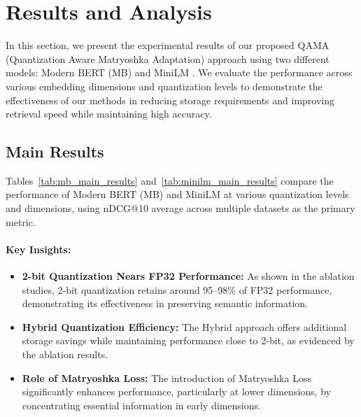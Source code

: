 \section{Results and Analysis}
\label{sec:results}

In this section, we present the experimental results of our proposed QAMA (Quantization Aware Matryoshka Adaptation) approach using two different models: Modern BERT (MB) \cite{modernbert, nussbaum2024nomic} and MiniLM \cite{minilm, reimers-2019-sentence-bert}. 
We evaluate the performance across various embedding dimensions and quantization levels to demonstrate the effectiveness of our methods in reducing storage requirements and improving retrieval speed while maintaining high accuracy.

\subsection{Main Results}
\label{sec:main_results}

Tables~\ref{tab:mb_main_results} and~\ref{tab:minilm_main_results} compare the performance of Modern BERT (MB) and MiniLM at various quantization levels and dimensions, using nDCG@10 average across multiple datasets as the primary metric. 
\paragraph{Key Insights:}
\begin{itemize}
    \item \textbf{2-bit Quantization Nears FP32 Performance:} As shown in the ablation studies, 2-bit quantization retains around 95--98\% of FP32 performance, demonstrating its effectiveness in preserving semantic information.
    \item \textbf{Hybrid Quantization Efficiency:} The Hybrid approach offers additional storage savings while maintaining performance close to 2-bit, as evidenced by the ablation results.
    \item \textbf{Role of Matryoshka Loss:} The introduction of Matryoshka Loss significantly enhances performance, particularly at lower dimensions, by concentrating essential information in early dimensions.
\end{itemize}

